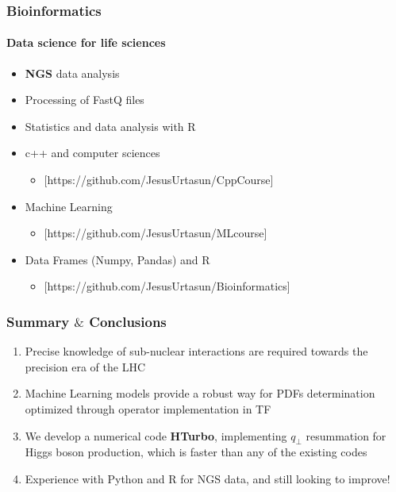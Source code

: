 \documentclass[aspectratio=43]{beamer}
\begin{document}
\begin{frame}
	
	\frametitle{Bioinformatics}
	\framesubtitle{Data science for life sciences}
	
	\begin{itemize}
		\item \textbf{NGS} data analysis
		\item Processing of FastQ files
		\item Statistics and data analysis with R
	\end{itemize}

	\begin{itemize}
		\item c++ and computer sciences
		\begin{itemize}
			\item {\color{blue}[https://github.com/JesusUrtasun/CppCourse]}
		\end{itemize}
		\item Machine Learning
		\begin{itemize}
			\item {\color{blue}[https://github.com/JesusUrtasun/MLcourse]}
		\end{itemize}
		\item Data Frames (Numpy, Pandas) and R
		\begin{itemize}
			\item {\color{blue}[https://github.com/JesusUrtasun/Bioinformatics]}
		\end{itemize}
	
	\end{itemize}

\end{frame}

\begin{frame}
	
	\frametitle{Summary $\&$ Conclusions}

	\vspace{2.0 cm}
	
	\begin{enumerate}
		\item \footnotesize Precise knowledge of sub-nuclear interactions are required towards the precision era of the LHC
		\item \footnotesize Machine Learning models provide a robust way for PDFs determination optimized through {\color{blue}operator implementation in TF}
		\item \footnotesize We develop a numerical code \textbf{HTurbo}, implementing $q_{\perp}$ resummation for Higgs boson production, which is {\color{blue} faster than any of the existing codes}
		\item \footnotesize Experience with Python and R for NGS data, and still looking to improve!

	\end{enumerate}

	\vspace{2.0 cm}

\end{frame}
\end{document}
